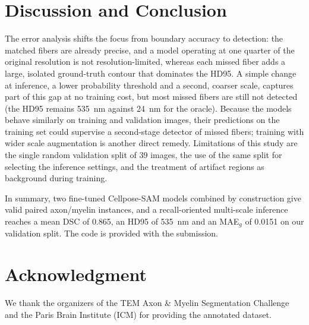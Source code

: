 \documentclass[conference]{IEEEtran}
\begin{document}
\section{Discussion and Conclusion}

The error analysis shifts the focus from boundary accuracy to detection: the
matched fibers are already precise, and a model operating at one quarter of the
original resolution is not resolution-limited, whereas each missed fiber adds a
large, isolated ground-truth contour that dominates the HD95. A simple change at
inference, a lower probability threshold and a second, coarser scale, captures
part of this gap at no training cost, but most missed fibers are still not
detected (the HD95 remains 535~nm against 24~nm for the oracle). Because the
models behave similarly on training and validation images, their predictions
on the training set could supervise a second-stage detector of missed fibers;
training with wider scale augmentation is another direct remedy. Limitations of
this study are the single random validation split of 39 images, the use of
the same split for selecting the inference settings, and the treatment of
artifact regions as background during training.

In summary, two fine-tuned Cellpose-SAM models combined by construction give
valid paired axon/myelin instances, and a recall-oriented multi-scale inference
reaches a mean DSC of 0.865, an HD95 of 535~nm and an MAE$_g$ of 0.0151 on our
validation split. The code is provided with the submission.

\section*{Acknowledgment}
We thank the organizers of the TEM Axon \& Myelin Segmentation Challenge and the
Paris Brain Institute (ICM) for providing the annotated dataset.



\end{document}
